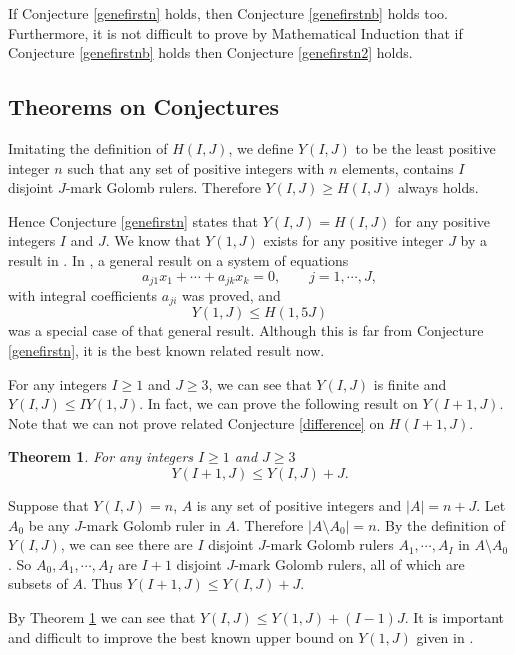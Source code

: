 \documentclass[preprint,12pt]{elsarticle}
\newtheorem{thm}{Theorem}
\begin{document}
If Conjecture \ref{genefirstn} holds, then Conjecture \ref{genefirstnb} holds too.
Furthermore, it is not difficult to prove by Mathematical Induction that
if Conjecture \ref{genefirstnb} holds
then Conjecture \ref{genefirstn2} holds.



\subsection{Theorems on Conjectures}\label{23}


Imitating the definition of $H(I,J)$, we define $Y(I,J)$ to be
the least positive integer $n$
such that any set of positive integers with $n$ elements,
contains $I$ disjoint $J$-mark Golomb rulers.
Therefore $Y(I,J) \ge H(I,J)$ always holds.

Hence Conjecture \ref{genefirstn} states that
$Y(I,J) = H(I,J)$ for any positive integers $I$ and $J$.
We know that $Y(1,J)$ exists for any positive integer $J$ by a result in \cite{kssa1975}.
In \cite{RuzsaII1995}, a general result on a system of equations
$$a_ {j1}x_1 + \cdots + a_ {jk}x_k = 0, \qquad j = 1, \cdots, J,$$
with integral coefficients $a_ {ji}$ was proved, and
$$Y(1, J) \leq H(1, 5J)$$
was a special case of that general result.
Although this is far from Conjecture \ref{genefirstn}, it is the best known related result now.




For any integers $I \geq 1$ and $J \geq 3$, we
can see that $Y(I,J)$ is finite and
$Y(I,J) \le I Y(1,J)$.
In fact, we can prove the following result on $Y(I+1, J)$.
Note that we can not prove related Conjecture \ref{difference} on
$H(I+1, J)$.

\begin{thm}\label{ThmY}
For any integers $I \geq 1$ and $J \geq 3$
$$Y(I+1, J) \leq Y(I, J) + J.$$
\end{thm}
\begin{pf}

Suppose that $Y(I, J) = n$, $A$ is any set of positive integers and  $|A| = n+J$.
Let $A_0$ be any $J$-mark Golomb ruler in $A$.
Therefore $|A \setminus A_0| = n$.
By the definition of $Y(I,J)$, we can see
there are $I$ disjoint $J$-mark Golomb rulers $A_1, \cdots, A_I$ in $A \setminus A_0$.
So $A_0, A_1, \cdots, A_I$ are $I+1$ disjoint $J$-mark Golomb rulers, all of which are subsets of $A$.
Thus $Y(I+1, J) \leq Y(I, J) + J$.
\end{pf}


By Theorem \ref{ThmY} we can see that $Y(I,J) \leq Y(1,J) + (I - 1)J$.
It is important and difficult to improve the best known upper bound on $Y(1,J)$ given in \cite{RuzsaII1995}.
\end{document}
